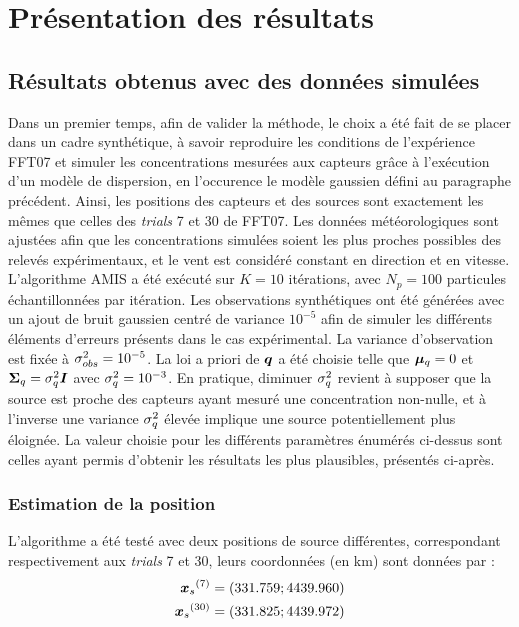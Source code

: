 \section{Présentation des résultats}

\subsection{Résultats obtenus avec des données simulées}
\label{par_simule}

Dans un premier temps, afin de valider la méthode, le choix a été fait de se placer dans un cadre synthétique, à savoir reproduire les conditions de l'expérience FFT07 et simuler les concentrations mesurées aux capteurs grâce à l'exécution d'un modèle de dispersion, en l'occurence le modèle gaussien défini au paragraphe précédent. Ainsi, les positions des capteurs et des sources sont exactement les mêmes que celles des \textit{trials} 7 et 30 de FFT07. Les données météorologiques sont ajustées afin que les concentrations simulées soient les plus proches possibles des relevés expérimentaux, et le vent est considéré constant en direction et en vitesse. \\

L'algorithme AMIS a été exécuté sur $K = 10$ itérations, avec $N_p = 100$ particules échantillonnées par itération. Les observations synthétiques ont été générées avec un ajout de bruit gaussien centré de variance $10^{-5}$ afin de simuler les différents éléments d'erreurs présents dans le cas expérimental. La variance d'observation est fixée à ${\sigma_{obs}^2} = 10^{-5}$. La loi a priori de ${\bm{q}}$ a été choisie telle que ${\bm{\mu}_q} = 0$ et ${\bm{\Sigma}_q} = \sigma_q^2 \bm{I}$ avec $\sigma_q^2 = 10^{-3}$. En pratique, diminuer $\sigma_q^2$ revient à supposer que la source est proche des capteurs ayant mesuré une concentration non-nulle, et à l'inverse une variance $\sigma_q^2$ élevée implique une source potentiellement plus éloignée. 
La valeur choisie pour les différents paramètres énumérés ci-dessus sont celles ayant permis d'obtenir les résultats les plus plausibles, présentés ci-après. \\

\subsubsection{Estimation de la position}

L'algorithme a été testé avec deux positions de source différentes, correspondant respectivement aux \textit{trials} 7 et 30, leurs coordonnées (en km) sont données par : 
\begin{equation}
\begin{split}
{\bm{x}_s}^{(7)} &= (331.759;4439.960) \\
{\bm{x}_s}^{(30)} &= (331.825;4439.972)
\end{split}
\end{equation}

